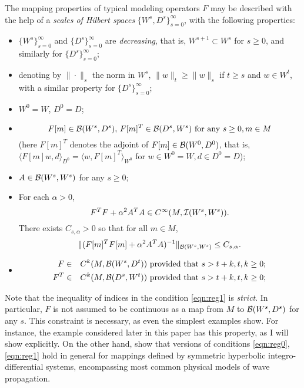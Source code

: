 The mapping properties of typical modeling operators $F$ may be
described with the help of a {\em scales of Hilbert spaces}
$\{W^s, D^s\}_{s=0}^{\infty}$, with the following properties:

\begin{itemize}
\item $\{W^s\}_{s=0}^{\infty}$ and $\{D^s\}_{s=0}^{\infty}$ are {\em decreasing}, that is,
  $W^{s+1} \subset W^s$ for $s \ge 0$, and similarly for $\{D^s\}_{s=0}^{\infty}$;
\item denoting by $\|\cdot\|_s$ the norm in $W^s$, $\|w\|_t \ge
  \|w\|_s$ if $t \ge s$ and $w \in W^t$, with a similar property for $\{D^s\}_{s=0}^{\infty}$;
\item $W^0=W$, $D^0=D$;
\item 
  \begin{equation}
    \label{eqn:reg0}
    F[m] \in {\cal B}(W^s,D^s),\,F[m]^T \in {\cal B}(D^s,W^s) \mbox{
      for any } s\ge 0, m\in M
  \end{equation}
  (here $F[m]^T$ denotes the adjoint of $F[m] \in {\cal B}(W^0,D^0)$,
  that is, $\langle F[m]w,d \rangle_{D^0} = \langle w,F[m]^T
  \rangle_{W^0}$ for $w \in W^0=W, d \in D^0=D$);
\item $A \in {\cal B}(W^s,W^s)$ for any $s \ge 0$;
\item For each $\alpha > 0$, 
  \begin{equation}
    \label{eqn:normsm}
    F^TF+\alpha^2A^TA \in C^{\infty}(M, {\cal I}(W^s,W^s)).
  \end{equation}
  There exists $C_{s,\alpha}>0$ so  that for all
    $m\in M$, 
    \begin{equation}
      \label{eqn:nopco}
      \|(F[m]^TF[m]+\alpha^2A^TA)^{-1}\|_{{\cal B}(W^s,W^s)} \le
      C_{s,\alpha}.
    \end{equation}
\item 
  \begin{eqnarray}
    F &\in& C^k(M, {\cal B}(W^s,D^t)) \mbox{ provided that }s > t+k, t, 
    k \ge 0;\\
    \label{eqn:reg1}
    F^T &\in& C^k(M, {\cal B}(D^s,W^t)) \mbox{ provided that }s > t+k, t, 
    k \ge 0;
    \label{eqn:reg2}
  \end{eqnarray}
\end{itemize}
Note that the inequality of indices in the condition \ref{eqn:reg1} is {\em
  strict}. In particular, $F$ is not assumed to be continuous as a map
from $M$ to ${\cal B}(W^s,D^s)$ for any $s$. This constraint is
necessary, as even the simplest examples show. For instance, the
example considered later in this paper has this property, as I will
show explicitly. On the other hand,
\cite{BlazekStolkSymes:13} show that versions of conditions
\ref{eqn:reg0}, \ref{eqn:reg1} hold in
general for mappings defined by symmetric hyperbolic
integro-differential systems, encompassing most common physical models
of wave propagation.

